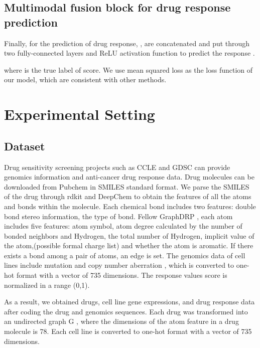 \documentclass{article}
\begin{document}
\subsection{Multimodal fusion block for drug response prediction}






Finally, for the prediction of drug response,  ,  are  concatenated and put through two fully-connected layers   and ReLU activation function  to predict the response .




\noindent where  is the true label of  score. We use mean squared loss  as the loss function of our model, which are consistent with other methods.







\section{Experimental Setting}


\subsection{Dataset}


Drug sensitivity screening projects such as CCLE \cite{CCLE}
 and GDSC \cite{GDSC} can provide genomics information and anti-cancer drug response data.
Drug molecules can be downloaded from Pubchem in SMILES standard format.
We parse the SMILES of the drug through rdkit and DeepChem to obtain the features of all the atoms and bonds within the molecule. Each chemical bond includes two features: double bond stereo information, the type of bond.
Fellow GraphDRP \cite{110bGCNforDRP}, each atom includes five features: atom symbol, atom degree calculated by the number of bonded neighbors and Hydrogen, the total number of Hydrogen, implicit value of the atom,(possible formal charge list) and whether the atom is aromatic.
If there exists a bond among a pair of atoms, an edge is set.
The genomics data of cell lines include mutation and copy number aberration , which is converted to one-hot format with a vector of 735 dimensions.
The response values  score is normalized in a range (0,1).



As a result, we obtained  drugs,  cell line gene expressions, and  drug response data after coding the drug and genomics sequences. Each drug was transformed into an undirected graph G , where the dimensions of the atom feature in a drug molecule is 78. Each cell line is converted to one-hot format with a vector of 735 dimensions.
\end{document}
